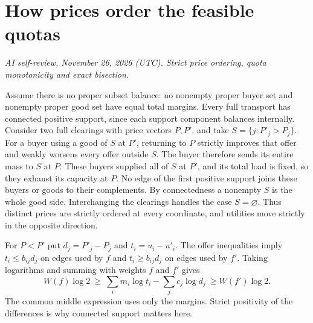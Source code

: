 \documentclass[11pt,oneside,openany,notitlepage]{report}
\newcommand{\reviewdate}{November 26, 2026 (UTC)}
\newcommand{\reviewmark}[1]{\par\nopagebreak[4]\noindent
  {\footnotesize\itshape AI self-review, \reviewdate. #1\par}\nobreak\smallskip}
\begin{document}
\section{How prices order the feasible quotas}
\reviewmark{Strict price ordering, quota monotonicity and exact bisection.}

Assume there is no proper subset balance: no nonempty proper buyer set
and nonempty proper good set have equal total margins. Every full
transport has connected positive support, since each support component
balances internally. Consider two full clearings with price vectors
\(P,P'\), and take \(S=\{j:P'_j>P_j\}\). For a buyer using a good
of \(S\) at \(P'\), returning to \(P\) strictly improves that offer
and weakly worsens every offer outside \(S\). The buyer therefore
sends its entire mass to \(S\) at \(P\). These buyers supplied all
of \(S\) at \(P'\), and its total load is fixed, so they exhaust
its capacity at \(P\). No edge of the first positive support joins
these buyers or goods to their complements. By connectedness a
nonempty \(S\) is the whole good side. Interchanging the clearings
handles the case \(S=\varnothing\). Thus distinct prices are strictly ordered at
every coordinate, and utilities move strictly in the opposite direction.

For \(P<P'\) put \(d_j=P'_j-P_j\) and \(t_i=u_i-u'_i\). The offer
inequalities imply \(t_i\le b_{ij}d_j\) on edges used by \(f\) and
\(t_i\ge b_{ij}d_j\) on edges used by \(f'\). Taking logarithms and
summing with weights \(f\) and \(f'\) gives
\begin{equation}\label{eq:quota-order}
 W(f)\log 2\ \ge\
 \sum_i m_i\log t_i-\sum_jc_j\log d_j\
 \ge W(f')\log 2 .
\end{equation}
The common middle expression uses only the margins. Strict positivity
of the differences is why connected support matters here.
\end{document}
